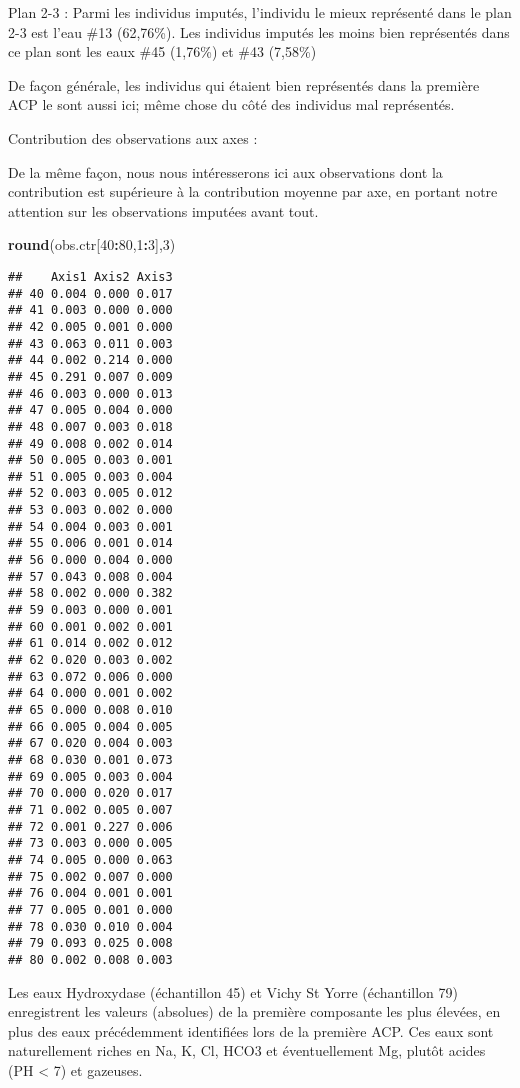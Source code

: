 \documentclass[]{article}
\newenvironment{Shaded}{\begin{snugshade}}{\end{snugshade}}
\newcommand{\KeywordTok}[1]{\textcolor[rgb]{0.13,0.29,0.53}{\textbf{#1}}}
\newcommand{\DecValTok}[1]{\textcolor[rgb]{0.00,0.00,0.81}{#1}}
\newcommand{\OperatorTok}[1]{\textcolor[rgb]{0.81,0.36,0.00}{\textbf{#1}}}
\newcommand{\NormalTok}[1]{#1}
\begin{document}
Plan 2-3 : Parmi les individus imputés, l'individu le mieux représenté
dans le plan 2-3 est l'eau \#13 (62,76\%). Les individus imputés les
moins bien représentés dans ce plan sont les eaux \#45 (1,76\%) et \#43
(7,58\%)

De façon générale, les individus qui étaient bien représentés dans la
première ACP le sont aussi ici; même chose du côté des individus mal
représentés.

Contribution des observations aux axes :

De la même façon, nous nous intéresserons ici aux observations dont la
contribution est supérieure à la contribution moyenne par axe, en
portant notre attention sur les observations imputées avant tout.

\begin{Shaded}
\begin{Highlighting}[]
\KeywordTok{round}\NormalTok{(obs.ctr[}\DecValTok{40}\OperatorTok{:}\DecValTok{80}\NormalTok{,}\DecValTok{1}\OperatorTok{:}\DecValTok{3}\NormalTok{],}\DecValTok{3}\NormalTok{)}
\end{Highlighting}
\end{Shaded}

\begin{verbatim}
##    Axis1 Axis2 Axis3
## 40 0.004 0.000 0.017
## 41 0.003 0.000 0.000
## 42 0.005 0.001 0.000
## 43 0.063 0.011 0.003
## 44 0.002 0.214 0.000
## 45 0.291 0.007 0.009
## 46 0.003 0.000 0.013
## 47 0.005 0.004 0.000
## 48 0.007 0.003 0.018
## 49 0.008 0.002 0.014
## 50 0.005 0.003 0.001
## 51 0.005 0.003 0.004
## 52 0.003 0.005 0.012
## 53 0.003 0.002 0.000
## 54 0.004 0.003 0.001
## 55 0.006 0.001 0.014
## 56 0.000 0.004 0.000
## 57 0.043 0.008 0.004
## 58 0.002 0.000 0.382
## 59 0.003 0.000 0.001
## 60 0.001 0.002 0.001
## 61 0.014 0.002 0.012
## 62 0.020 0.003 0.002
## 63 0.072 0.006 0.000
## 64 0.000 0.001 0.002
## 65 0.000 0.008 0.010
## 66 0.005 0.004 0.005
## 67 0.020 0.004 0.003
## 68 0.030 0.001 0.073
## 69 0.005 0.003 0.004
## 70 0.000 0.020 0.017
## 71 0.002 0.005 0.007
## 72 0.001 0.227 0.006
## 73 0.003 0.000 0.005
## 74 0.005 0.000 0.063
## 75 0.002 0.007 0.000
## 76 0.004 0.001 0.001
## 77 0.005 0.001 0.000
## 78 0.030 0.010 0.004
## 79 0.093 0.025 0.008
## 80 0.002 0.008 0.003
\end{verbatim}

Les eaux Hydroxydase (échantillon 45) et Vichy St Yorre (échantillon 79)
enregistrent les valeurs (absolues) de la première composante les plus
élevées, en plus des eaux précédemment identifiées lors de la première
ACP. Ces eaux sont naturellement riches en Na, K, Cl, HCO3 et
éventuellement Mg, plutôt acides (PH \textless{} 7) et gazeuses.
\end{document}
